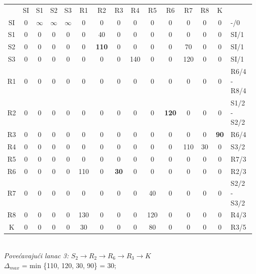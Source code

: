 \documentclass[12pt]{article}
\begin{document}
\begin{enumerate}
\begin{center}
\begin{tabular}{|c|c|c|c|c|c|c|c|c|c|c|c|c|c|l}
\cline{1-14}
 & SI & S1 & S2 & S3 & R1 & R2 & R3 & R4 & R5 & R6 & R7 & R8 & K &  \\ \cline{1-14}
SI & 0 & $\infty$ & $\infty$ & $\infty$ & 0 & 0 & 0 & 0 & 0 & 0 & 0 & 0 & 0 & -/0 \\ \cline{1-14}
S1 & 0 & 0 & 0 & 0 & 0 & 40 & 0 & 0 & 0 & 0 & 0 & 0 & 0 & SI/1 \\ \cline{1-14}
S2 & 0 & 0 & 0 & 0 & 0 & \textbf{110} & 0 & 0 & 0 & 0 & 70 & 0 & 0 & SI/1 \\ \cline{1-14}
S3 & 0 & 0 & 0 & 0 & 0 & 0 & 0 & 140 & 0 & 0 & 120 & 0 & 0 & SI/1 \\ \cline{1-14}
R1 & 0 & 0 & 0 & 0 & 0 & 0 & 0 & 0 & 0 & 0 & 0 & 0 & 0 & R6/4 - R8/4 \\ \cline{1-14}
R2 & 0 & 0 & 0 & 0 & 0 & 0 & 0 & 0 & 0 & \textbf{120} & 0 & 0 & 0 & S1/2 - S2/2 \\ \cline{1-14}
R3 & 0 & 0 & 0 & 0 & 0 & 0 & 0 & 0 & 0 & 0 & 0 & 0 & \textbf{90} & R6/4 \\ \cline{1-14}
R4 & 0 & 0 & 0 & 0 & 0 & 0 & 0 & 0 & 0 & 0 & 110 & 30 & 0 & S3/2 \\ \cline{1-14}
R5 & 0 & 0 & 0 & 0 & 0 & 0 & 0 & 0 & 0 & 0 & 0 & 0 & 0 & R7/3 \\ \cline{1-14}
R6 & 0 & 0 & 0 & 0 & 110 & 0 & \textbf{30} & 0 & 0 & 0 & 0 & 0 & 0 & R2/3 \\ \cline{1-14}
R7 & 0 & 0 & 0 & 0 & 0 & 0 & 0 & 0 & 40 & 0 & 0 & 0 & 0 & S2/2 - S3/2 \\ \cline{1-14}
R8 & 0 & 0 & 0 & 0 & 130 & 0 & 0 & 0 & 120 & 0 & 0 & 0 & 0 & R4/3 \\ \cline{1-14}
K & 0 & 0 & 0 & 0 & 30 & 0 & 0 & 0 & 80 & 0 & 0 & 0 & 0 & R3/5 \\ \cline{1-14}
\end{tabular}
\\
\vspace{0.5cm}
\textit{Povećavajući lanac 3: $S_2 \rightarrow R_2 \rightarrow R_6 \rightarrow R_3 \rightarrow K$}\\
$\Delta_{max}$ = min \{110, 120, 30, 90\} = 30;\\


\end{center}
\end{enumerate}
\end{document}
